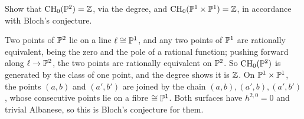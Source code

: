 \begin{exercise}\label{standard-conjectures:exercise-chow-plane}
Show that $\operatorname{CH}_0(\mathbb{P}^2) = \mathbb{Z}$, via the degree, and $\operatorname{CH}_0(\mathbb{P}^1 \times \mathbb{P}^1) = \mathbb{Z}$, in accordance with Bloch's conjecture.
\end{exercise}

\begin{solution}
Two points of $\mathbb{P}^2$ lie on a line $\ell \cong \mathbb{P}^1$, and any two points of $\mathbb{P}^1$ are rationally equivalent, being the zero and the pole of a rational function; pushing forward along $\ell \to \mathbb{P}^2$, the two points are
rationally equivalent on $\mathbb{P}^2$. So $\operatorname{CH}_0(\mathbb{P}^2)$ is generated by the class of one point, and the degree shows it is $\mathbb{Z}$. On $\mathbb{P}^1 \times \mathbb{P}^1$, the points $(a, b)$ and $(a', b')$ are joined by the chain
$(a, b), (a', b), (a', b')$, whose consecutive points lie on a fibre $\cong \mathbb{P}^1$. Both surfaces have $h^{2,0} = 0$ and trivial Albanese, so this is Bloch's conjecture for them.
\end{solution}
